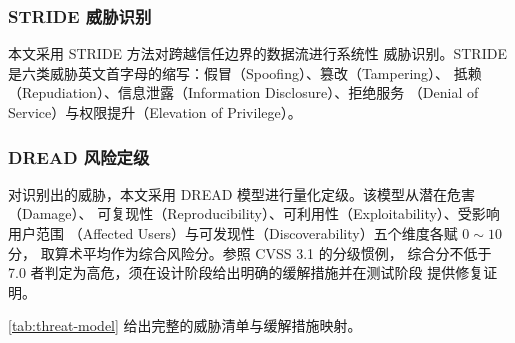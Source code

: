 \subsubsection{STRIDE 威胁识别}

本文采用 STRIDE 方法\cite{shostack2014threat}对跨越信任边界的数据流进行系统性
威胁识别。STRIDE 是六类威胁英文首字母的缩写：假冒（Spoofing）、篡改（Tampering）、
抵赖（Repudiation）、信息泄露（Information Disclosure）、拒绝服务
（Denial of Service）与权限提升（Elevation of Privilege）。

\subsubsection{DREAD 风险定级}

对识别出的威胁，本文采用 DREAD 模型进行量化定级。该模型从潜在危害（Damage）、
可复现性（Reproducibility）、可利用性（Exploitability）、受影响用户范围
（Affected Users）与可发现性（Discoverability）五个维度各赋 $0\sim10$ 分，
取算术平均作为综合风险分。参照 CVSS 3.1 的分级惯例\cite{first2019cvss}，
综合分不低于 7.0 者判定为高危，须在设计阶段给出明确的缓解措施并在测试阶段
提供修复证明。

\cref{tab:threat-model} 给出完整的威胁清单与缓解措施映射。

